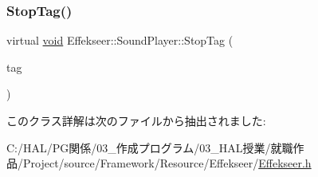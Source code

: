 \mbox{\label{class_effekseer_1_1_sound_player_a4726bc7f3f4049508a268f16a4beeb56}} 
\subsubsection{\texorpdfstring{Stop\+Tag()}{StopTag()}}
{\footnotesize\ttfamily virtual \mbox{\hyperlink{namespace_effekseer_ab34c4088e512200cf4c2716f168deb56}{void}} Effekseer\+::\+Sound\+Player\+::\+Stop\+Tag (\begin{DoxyParamCaption}\item[{\mbox{\hyperlink{namespace_effekseer_adb219197297396cf2ab9bee657551a29}{Sound\+Tag}}}]{tag }\end{DoxyParamCaption})\hspace{0.3cm}{\ttfamily [pure virtual]}}



このクラス詳解は次のファイルから抽出されました\+:\begin{DoxyCompactItemize}
\item 
C\+:/\+H\+A\+L/\+P\+G関係/03\+\_\+作成プログラム/03\+\_\+\+H\+A\+L授業/就職作品/\+Project/source/\+Framework/\+Resource/\+Effekseer/\mbox{\hyperlink{_effekseer_8h}{Effekseer.\+h}}\end{DoxyCompactItemize}
